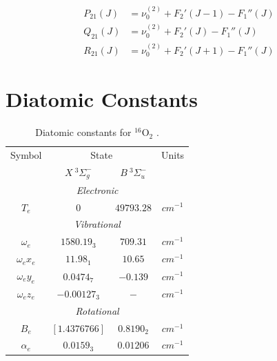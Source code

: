 \documentclass[11pt, twoside, fleqn]{report}
\begin{document}
\begin{align*}
    P_{21}(J) &= \nu_0^{(2)} + F_2'(J - 1) - F_1''(J) \\
    Q_{21}(J) &= \nu_0^{(2)} + F_2'(J) - F_1''(J) \\
    R_{21}(J) &= \nu_0^{(2)} + F_2'(J + 1) - F_1''(J)
\end{align*}

\appendix
\chapter{Diatomic Constants}
\label{a:diatomic_constants}

\begin{table}[H]
    \centering
    \caption{Diatomic constants for $^{16}\mathrm{O}_2$ \cite{nist:diatomic}.}
    \label{t:diatomic_constants_for_o2}
    \begin{tabular}{cccc}
        \toprule
        Symbol        & \multicolumn{2}{c}{State} & Units                                      \\
        \cmidrule(lr){2-3}
                      & $X~^3\Sigma_g^-$          & $B~^3\Sigma_u^-$        &                  \\
        \midrule
        \multicolumn{4}{c}{\textit{Electronic}}                                                \\
        \cmidrule(lr){1-4}
        $T_e$         & $0$                       & $49793.28$              & $\unit{cm^{-1}}$ \\
        \multicolumn{4}{c}{\textit{Vibrational}}                                               \\
        \cmidrule(lr){1-4}
        $\omega_e$    & $1580.19_3$               & $709.31$                & $\unit{cm^{-1}}$ \\
        $\omega_ex_e$ & $11.98_1$                 & $10.65$                 & $\unit{cm^{-1}}$ \\
        $\omega_ey_e$ & $0.0474_7$                & $-0.139$                & $\unit{cm^{-1}}$ \\
        $\omega_ez_e$ & $-0.00127_3$              & $-$                     & $\unit{cm^{-1}}$ \\
        \multicolumn{4}{c}{\textit{Rotational}}                                                \\
        \cmidrule(lr){1-4}
        $B_e$         & $[1.4376766]$             & $0.8190_2$              & $\unit{cm^{-1}}$ \\
        $\alpha_e$    & $0.0159_3$                & $0.01206$               & $\unit{cm^{-1}}$ \\

\end{tabular}
\end{table}
\end{document}
